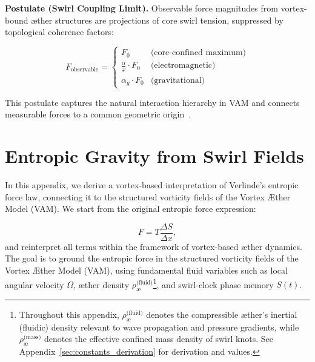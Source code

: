 \documentclass[preprint]{revtex4-2}
\begin{document}
            \textbf{Postulate (Swirl Coupling Limit).} Observable force magnitudes from vortex-bound æther structures are projections of core swirl tension, suppressed by topological coherence factors:
        
            \begin{equation}
            F_{\text{observable}} = \left\{
            \begin{array}{ll}
            F_0 & \text{(core-confined maximum)} \\
            \frac{\alpha}{\varphi} \cdot F_0 & \text{(electromagnetic)} \\
            \alpha_g \cdot F_0 & \text{(gravitational)}
            \end{array}
            \right.
            \end{equation}
        
            This postulate captures the natural interaction hierarchy in VAM and connects measurable forces to a common geometric origin~\cite{kleckner2013knots}.
        \section{Entropic Gravity from Swirl Fields}\label{sec:verlinde_mapping}
            In this appendix, we derive a vortex-based interpretation of Verlinde's entropic force law, connecting it to the structured vorticity fields of the Vortex \AE{}ther Model (VAM). We start from the original entropic force expression:

            \begin{equation}
                F = T \frac{\Delta S}{\Delta x},
            \end{equation}
            and reinterpret all terms within the framework of vortex-based æther dynamics. The goal is to ground the entropic force in the structured vorticity fields of the Vortex \AE ther Model (VAM), using fundamental fluid variables such as local angular velocity $\Omega$, æther density $\rho_{\text{\ae}}^{\text{(fluid)}}$\footnote{Throughout this appendix, \(\rho_{\text{\ae}}^{\text{(fluid)}}\) denotes the compressible æther’s inertial (fluidic) density relevant to wave propagation and pressure gradients, while \(\rho_{\text{\ae}}^{\text{(mass)}}\) denotes the effective confined mass density of swirl knots. See Appendix~\ref{sec:constants_derivation} for derivation and values.}, and swirl-clock phase memory $S(t)$.
\end{document}
